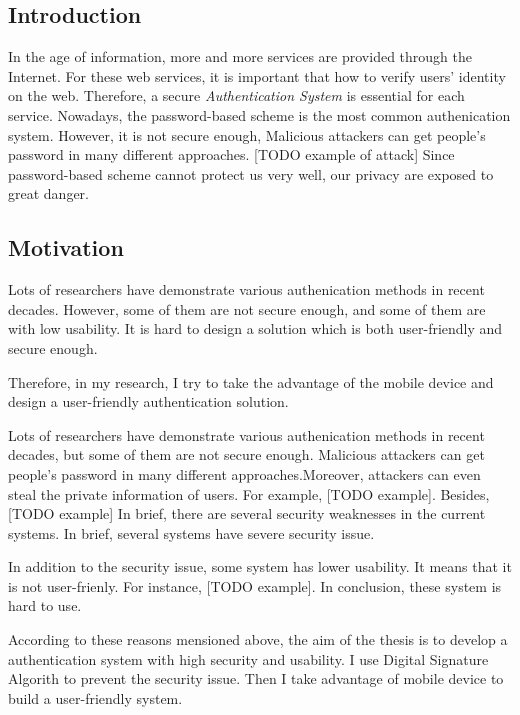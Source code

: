 
\begin{CJK}{Bg5}{bsmi}



\chapter{Introduction}

In the age of information, more and more services are provided through the Internet. For these web services, it is important that how to verify users' identity on the web. Therefore, a secure \emph{Authentication System} is essential for each service. Nowadays, the password-based scheme is the most common authenication system. However, it is not secure enough, Malicious attackers can get people's password in many different approaches. [TODO example of attack] Since password-based scheme cannot protect us very well, our privacy are exposed to great danger.

\section{Motivation}

Lots of researchers have demonstrate various authenication methods in recent decades. However, some of them are not secure enough, and some of them are with low usability. It is hard to design a solution which is both user-friendly and secure enough.

Therefore, in my research, I try to take the advantage of the mobile device and design a user-friendly authentication solution. 

Lots of researchers have demonstrate various authenication methods in recent decades, but some of them are not secure enough. Malicious attackers can get people's password in many different approaches.Moreover, attackers can even steal the private information of users. For example, [TODO example]. Besides, [TODO example] In brief, there are several security weaknesses in the current systems. In brief, several systems have severe security issue.

In addition to the security issue, some system has lower usability. It means that it is not user-frienly. For instance, [TODO example]. In conclusion, these system is hard to use.

According to these reasons mensioned above, the aim of the thesis is to develop a authentication system with high security and usability. I use Digital Signature Algorith to prevent the security issue. Then I take advantage of mobile device to build a user-friendly system.


\end{CJK}
